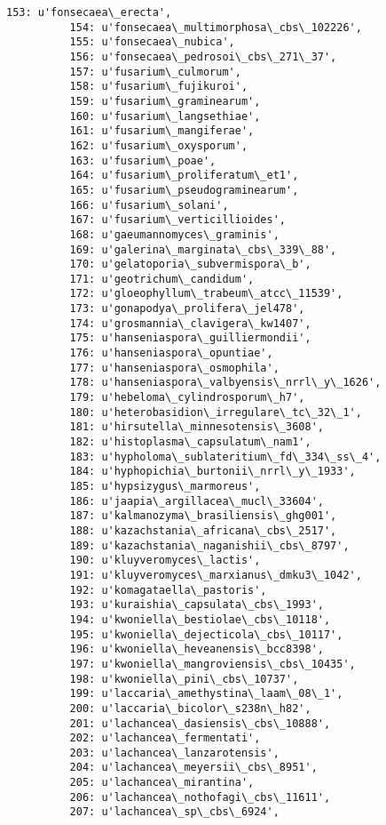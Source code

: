 \documentclass[11pt]{article}
\begin{document}
\begin{Verbatim}[commandchars=\\\{\}]
          153: u'fonsecaea\_erecta',
          154: u'fonsecaea\_multimorphosa\_cbs\_102226',
          155: u'fonsecaea\_nubica',
          156: u'fonsecaea\_pedrosoi\_cbs\_271\_37',
          157: u'fusarium\_culmorum',
          158: u'fusarium\_fujikuroi',
          159: u'fusarium\_graminearum',
          160: u'fusarium\_langsethiae',
          161: u'fusarium\_mangiferae',
          162: u'fusarium\_oxysporum',
          163: u'fusarium\_poae',
          164: u'fusarium\_proliferatum\_et1',
          165: u'fusarium\_pseudograminearum',
          166: u'fusarium\_solani',
          167: u'fusarium\_verticillioides',
          168: u'gaeumannomyces\_graminis',
          169: u'galerina\_marginata\_cbs\_339\_88',
          170: u'gelatoporia\_subvermispora\_b',
          171: u'geotrichum\_candidum',
          172: u'gloeophyllum\_trabeum\_atcc\_11539',
          173: u'gonapodya\_prolifera\_jel478',
          174: u'grosmannia\_clavigera\_kw1407',
          175: u'hanseniaspora\_guilliermondii',
          176: u'hanseniaspora\_opuntiae',
          177: u'hanseniaspora\_osmophila',
          178: u'hanseniaspora\_valbyensis\_nrrl\_y\_1626',
          179: u'hebeloma\_cylindrosporum\_h7',
          180: u'heterobasidion\_irregulare\_tc\_32\_1',
          181: u'hirsutella\_minnesotensis\_3608',
          182: u'histoplasma\_capsulatum\_nam1',
          183: u'hypholoma\_sublateritium\_fd\_334\_ss\_4',
          184: u'hyphopichia\_burtonii\_nrrl\_y\_1933',
          185: u'hypsizygus\_marmoreus',
          186: u'jaapia\_argillacea\_mucl\_33604',
          187: u'kalmanozyma\_brasiliensis\_ghg001',
          188: u'kazachstania\_africana\_cbs\_2517',
          189: u'kazachstania\_naganishii\_cbs\_8797',
          190: u'kluyveromyces\_lactis',
          191: u'kluyveromyces\_marxianus\_dmku3\_1042',
          192: u'komagataella\_pastoris',
          193: u'kuraishia\_capsulata\_cbs\_1993',
          194: u'kwoniella\_bestiolae\_cbs\_10118',
          195: u'kwoniella\_dejecticola\_cbs\_10117',
          196: u'kwoniella\_heveanensis\_bcc8398',
          197: u'kwoniella\_mangroviensis\_cbs\_10435',
          198: u'kwoniella\_pini\_cbs\_10737',
          199: u'laccaria\_amethystina\_laam\_08\_1',
          200: u'laccaria\_bicolor\_s238n\_h82',
          201: u'lachancea\_dasiensis\_cbs\_10888',
          202: u'lachancea\_fermentati',
          203: u'lachancea\_lanzarotensis',
          204: u'lachancea\_meyersii\_cbs\_8951',
          205: u'lachancea\_mirantina',
          206: u'lachancea\_nothofagi\_cbs\_11611',
          207: u'lachancea\_sp\_cbs\_6924',

\end{Verbatim}
\end{document}
